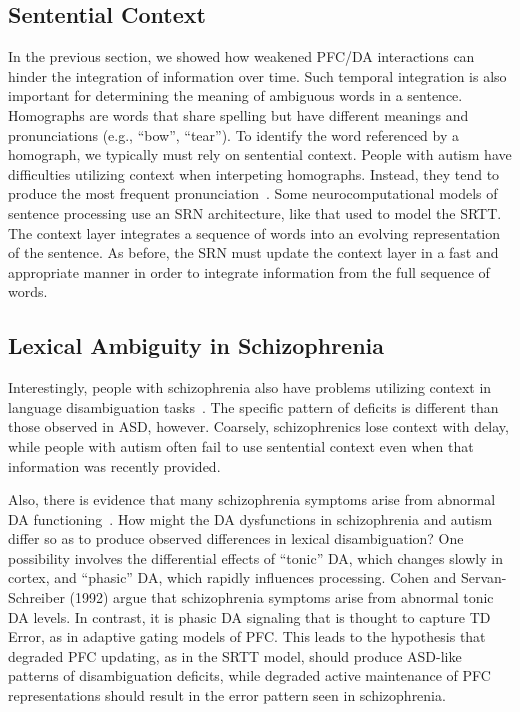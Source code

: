 %
%

\subsection{Sentential Context}
In the previous section, we showed how weakened PFC/DA interactions can hinder the integration of information over time. Such temporal integration is also important for determining the meaning of ambiguous words in a sentence. Homographs are words that share spelling but have different meanings and pronunciations (e.g., ``bow'', ``tear''). To identify the word referenced by a homograph, we typically must rely on sentential context. People with autism have difficulties utilizing context when interpeting homographs. Instead, they tend to produce the most frequent pronunciation~\cite{HappeF:1997:WCCHomographs}. Some neurocomputational models of sentence processing use an SRN architecture, like that used to model the SRTT. The context layer integrates a sequence of words into an evolving representation of the sentence. As before, the SRN must update the context layer in a fast and appropriate manner in order to integrate information from the full sequence of words.

\subsection{Lexical Ambiguity in Schizophrenia}
Interestingly, people with schizophrenia also have problems utilizing context in language disambiguation tasks~\cite{CohenJD:1992:Schizophrenia}. The specific pattern of deficits is different than those observed in ASD, however. Coarsely, schizophrenics lose context with delay, while people with autism often fail to use sentential context even when that information was recently provided.

Also, there is evidence that many schizophrenia symptoms arise from abnormal DA functioning~\cite{CohenJD:1992:Schizophrenia}. How might the DA dysfunctions in schizophrenia and autism differ so as to produce observed differences in lexical disambiguation? One possibility involves the differential effects of ``tonic'' DA, which changes slowly in cortex, and ``phasic'' DA, which rapidly influences processing. Cohen and Servan-Schreiber (1992) argue that schizophrenia symptoms arise from abnormal tonic DA levels. In contrast, it is phasic DA signaling that is thought to capture TD Error, as in adaptive gating models of PFC. This leads to the hypothesis that degraded PFC updating, as in the SRTT model, should produce ASD-like patterns of disambiguation deficits, while degraded active maintenance of PFC representations should result in the error pattern seen in schizophrenia.

